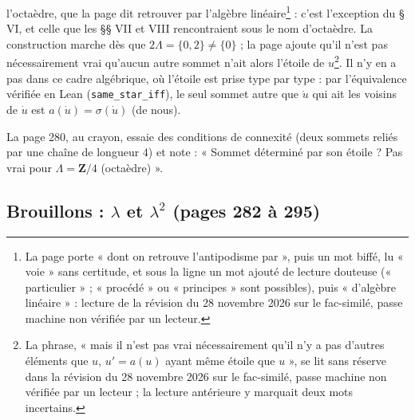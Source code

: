 \documentclass[11pt,a4paper]{article}
\begin{document}
l'octaèdre, que la page dit retrouver par l'algèbre linéaire\footnote{La
page porte « dont on retrouve l'antipodisme par », puis un mot biffé, lu
« voie » sans certitude, et sous la ligne un mot ajouté de lecture douteuse
(« particulier » ; « procédé » ou « principes » sont possibles), puis
« d'algèbre linéaire » : lecture de la
révision du 28 novembre 2026 sur le fac-similé, passe machine non vérifiée par un lecteur.} : c'est l'exception du §
VI, et celle que les §§ VII et VIII rencontraient sous le nom d'octaèdre. La
construction marche dès que $2\Lambda = \{0, 2\} \neq \{0\}$ ; la page
ajoute qu'il n'est pas nécessairement vrai qu'aucun autre sommet n'ait alors
l'étoile de $u$\footnote{La phrase, « mais il n'est pas vrai nécessairement
qu'il n'y a pas d'autres éléments que $u$, $u' = a(u)$ ayant même étoile que
$u$ », se lit sans réserve dans la
révision du 28 novembre 2026 sur le fac-similé, passe machine non vérifiée par un lecteur ;
la lecture antérieure y marquait deux mots incertains.}. Il n'y en a pas dans
ce cadre algébrique, où l'étoile est prise type par type : par l'équivalence
vérifiée en Lean (\texttt{same\_star\_iff}), le seul sommet autre que $\dot
u$ qui ait les voisins de $\dot u$ est $a(\dot u) = \sigma(\dot u)$ (de
nous).

La page 280, au crayon, essaie des conditions de connexité (deux sommets reliés
par une chaîne de longueur $4$) et note : « Sommet déterminé par son étoile ?
Pas vrai pour $\Lambda = \mathbf{Z}/4$ (octaèdre) ».

\subsection*{Brouillons : $\lambda$ et $\lambda^2$ (pages 282 à 295)}
\end{document}

